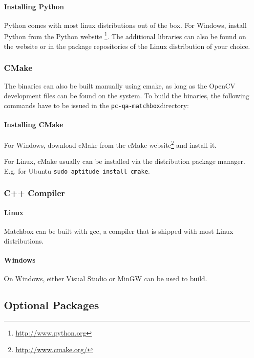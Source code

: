 \paragraph{Installing Python}

Python comes with most linux distributions out of the box. For Windows, 
install Python from the Python website \footnote{\url{http://www.python.org}}.
The additional libraries can also be found on the website or in the package repositories 
of the Linux distribution of your choice.


\subsubsection{CMake}


The binaries can also be built manually using cmake, as long as the OpenCV development files can be found on the system.
To build the binaries, the following commands have to be issued in the \verb+pc-qa-matchbox+directory:

\paragraph{Installing CMake}

For Windows, download cMake from the cMake website\footnote{\url{http://www.cmake.org/}} and install
it.

For Linux, cMake usually can be installed via the distribution package manager. 
E.g. for Ubuntu \verb+sudo aptitude install cmake+. 


\subsubsection{C++ Compiler}


\paragraph{Linux}

Matchbox can be built with gcc, a compiler 
that is shipped with most Linux distributions.

\paragraph{Windows}

On Windows, either Visual Studio or 
MinGW can be used to build.

\subsection{Optional Packages}

